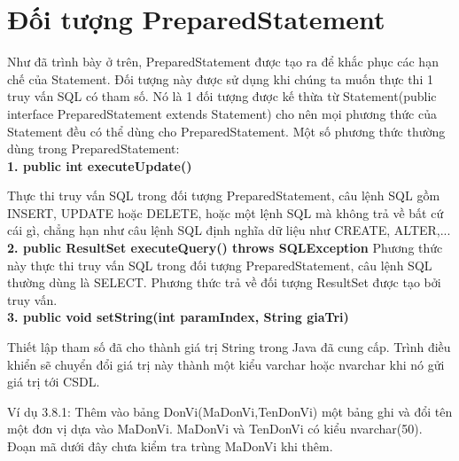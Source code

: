 \section{Đối tượng PreparedStatement}
 Như đã trình bày ở trên, PreparedStatement được tạo ra để khắc phục các hạn chế của Statement. Đối tượng này được sử dụng khi chúng ta muốn thực thi 1  truy vấn SQL có tham số.  Nó là 1 đối tượng được kế thừa từ Statement(public interface PreparedStatement extends Statement) cho nên mọi phương thức của Statement đều có thể dùng cho PreparedStatement.  Một số phương thức thường dùng trong PreparedStatement:\\
 \textbf{ 1. public int executeUpdate()}
 
 Thực thi truy vấn SQL trong đối tượng PreparedStatement, câu lệnh SQL gồm INSERT, UPDATE hoặc DELETE, hoặc một lệnh SQL mà không trả về bất cứ cái gì, chẳng hạn như câu lệnh SQL định nghĩa dữ liệu như CREATE, ALTER,...\\
 \textbf{2. public ResultSet executeQuery() throws SQLException}
 Phương thức này thực thi truy vấn SQL trong đối tượng PreparedStatement, câu lệnh SQL thường dùng là SELECT. Phương thức trả về đối tượng ResultSet được tạo bởi truy vấn. \\
 \textbf{3. public void setString(int paramIndex, String giaTri)}
 
 Thiết lập tham số đã cho thành giá trị String trong Java đã cung cấp. Trình điều khiển sẽ chuyển đổi giá trị này thành một kiểu varchar hoặc nvarchar khi nó gửi giá trị tới CSDL. 
 
 Ví dụ 3.8.1: Thêm vào bảng DonVi(MaDonVi,TenDonVi) một bảng ghi và đổi tên một đơn vị dựa vào MaDonVi. MaDonVi và TenDonVi có kiểu nvarchar(50). Đoạn mã dưới đây chưa kiểm tra trùng MaDonVi khi thêm.
 
